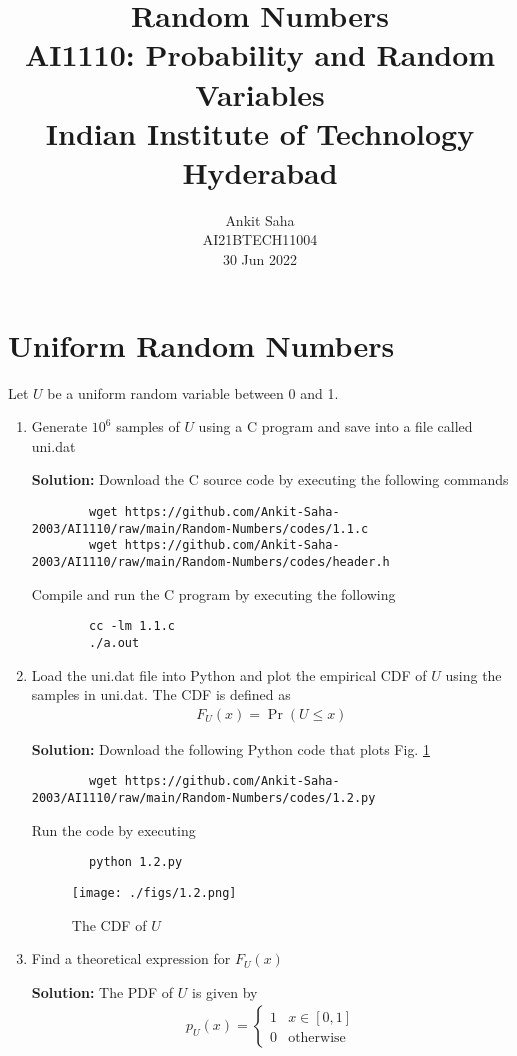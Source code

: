 \documentclass[journal,12pt,twocolumn]{IEEEtran}
\title{Random Numbers \\ \Large AI1110: Probability and Random Variables \\ \large Indian Institute of Technology Hyderabad}
\author{Ankit Saha \\ \normalsize AI21BTECH11004 \\ \vspace*{20pt} \normalsize  30 Jun 2022}
\newcommand{\solution}{\noindent \textbf{Solution: }}
\providecommand{\pr}[1]{\ensuremath{\Pr\left(#1\right)}}
\numberwithin{equation}{section}
\renewcommand\thesection{\arabic{section}}
\begin{document}
	\maketitle
	
	\section{Uniform Random Numbers}
	Let $U$ be a uniform random variable between 0 and 1.
	\begin{enumerate}[label=\thesection.\arabic*,ref=\thesection.\theenumi]
	\item Generate $10^6$ samples of $U$ using a C program and save into a file called uni.dat

	\solution Download the C source code by executing the following commands
	\begin{lstlisting}
		wget https://github.com/Ankit-Saha-2003/AI1110/raw/main/Random-Numbers/codes/1.1.c
		wget https://github.com/Ankit-Saha-2003/AI1110/raw/main/Random-Numbers/codes/header.h
	\end{lstlisting}
	Compile and run the C program by executing the following
	\begin{lstlisting}
		cc -lm 1.1.c
		./a.out
	\end{lstlisting}
	
	\item Load the uni.dat file into Python and plot the empirical CDF of $U$ using the samples in uni.dat. The CDF is defined as
	\begin{align}
		F_{U}(x) = \pr{U \le x}
	\end{align}

	\solution  Download the following Python code that plots Fig. \ref{fig-1.2}
	\begin{lstlisting}
		wget https://github.com/Ankit-Saha-2003/AI1110/raw/main/Random-Numbers/codes/1.2.py
	\end{lstlisting}
	Run the code by executing
	\begin{lstlisting}
		python 1.2.py
	\end{lstlisting}
	\begin{figure}
		\centering
		\texttt{[image: ./figs/1.2.png]}
		\caption{The CDF of $U$}
		\label{fig-1.2}
	\end{figure}
	
	\item Find a  theoretical expression for $F_{U}(x)$
	
	\solution The PDF of $U$ is given by
	\begin{align}
		p_{U}(x) = 
		\begin{cases}
			1 & x \in [0, 1] \\
			0 & \text{otherwise}
		\end{cases}
	\end{align}
	

\end{enumerate}
\end{document}
